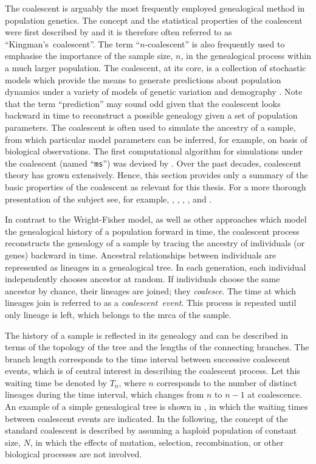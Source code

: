 The coalescent is arguably the most frequently employed genealogical method in population genetics.
The concept and the statistical properties of the coalescent were first described by \citet{Kingman:1982x,Kingman:1982gu,Kingman:1982uj} and it is therefore often referred to as ``Kingman's~coalescent''.
The term ``$n$-coalescent'' is also frequently used to emphasise the importance of the sample size, $n$, in the genealogical process within a much larger population.
The coalescent, at its core, is a collection of stochastic models which provide the means to generate predictions about population dynamics under a variety of models of genetic variation and demography \citep{wakeley2008}.
Note that the term ``prediction'' may sound odd given that the coalescent looks backward in time to reconstruct a possible genealogy given a set of population parameters.
The coalescent is often used to simulate the ancestry of a sample, from which particular model parameters can be inferred, for example, on basis of biological observations.
The first computational algorithm for simulations under the coalescent (named ``\texttt{ms}'') was devised by \citet{Hudson:1990vob}.
Over the past decades, coalescent theory has grown extensively.
Hence, this section provides only a summary of the basic properties of the coalescent as relevant for this thesis.
For a more thorough presentation of the subject see, for example, \citet{Fu:1999fj}, \citet{neuhauser2001}, \citet{nordborg2001coalescent}, \citet{hein2004gene}, and \citet{wakeley2008}.


In contrast to the Wright-Fisher model, as well as other approaches which model the genealogical history of a population forward in time, the coalescent process reconstructs the genealogy of a sample by tracing the ancestry of individuals (or genes) backward in time.
Ancestral relationships between individuals are represented as lineages in a genealogical tree.
In each generation, each individual independently chooses  ancestor at random.
If  individuals choose the same ancestor by chance, their lineages are joined; \ie they \emph{coalesce}.
The time at which  lineages join is referred to as a \emph{coalescent~event}.
This process is repeated until only  lineage is left, which belongs to the \gls{mrca} of the sample.

%

%

The history of a sample is reflected in its genealogy and can be described in terms of the topology of the tree and the lengths of the connecting branches.
The branch length corresponds to the time interval between  successive coalescent events, which is of central interest in describing the coalescent process.
Let this waiting time be denoted by $T_n$, where $n$ corresponds to the number of distinct lineages during the time interval, which changes from $n$ to ${n-1}$ at coalescence.
An example of a simple genealogical tree is shown in , in which the waiting times between coalescent events are indicated.
In the following, the concept of the standard coalescent is described by assuming a haploid population of constant size, $N$, in which the effects of mutation, selection, recombination, or other biological processes are not involved.

